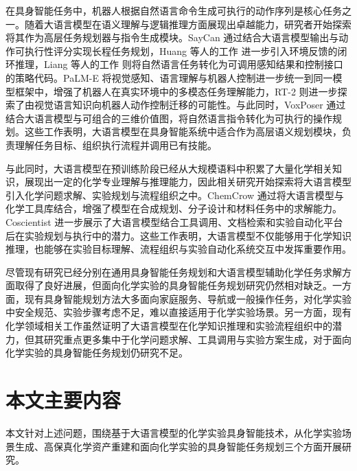 在具身智能任务中，机器人根据自然语言命令生成可执行的动作序列是核心任务之一。随着大语言模型在语义理解与逻辑推理方面展现出卓越能力，研究者开始探索将其作为高层任务规划器与指令生成模块。SayCan\cite{ichter2023saycan} 通过结合大语言模型输出与动作可执行性评分实现长程任务规划，Huang 等人的工作\cite{huang2023innermonologue} 进一步引入环境反馈的闭环推理，Liang 等人的工作\cite{liang2023codeaspolicies} 则将自然语言任务转化为可调用感知结果和控制接口的策略代码。PaLM-E\cite{driess2023palme} 将视觉感知、语言理解与机器人控制进一步统一到同一模型框架中，增强了机器人在真实环境中的多模态任务理解能力，RT-2\cite{zitkovich2023rt2} 则进一步探索了由视觉语言知识向机器人动作控制迁移的可能性。与此同时，VoxPoser\cite{huang2023voxposer} 通过结合大语言模型与可组合的三维价值图，将自然语言指令转化为可执行的操作规划。这些工作表明，大语言模型在具身智能系统中适合作为高层语义规划模块，负责理解任务目标、组织执行流程并调用已有技能。

与此同时，大语言模型在预训练阶段已经从大规模语料中积累了大量化学相关知识，展现出一定的化学专业理解与推理能力，因此相关研究开始探索将大语言模型引入化学问题求解、实验规划与流程组织之中。ChemCrow\cite{bran2024chemcrow} 通过将大语言模型与化学工具库结合，增强了模型在合成规划、分子设计和材料任务中的求解能力。Coscientist\cite{boiko2023coscientist} 进一步展示了大语言模型结合工具调用、文档检索和实验自动化平台后在实验规划与执行中的潜力。这些工作表明，大语言模型不仅能够用于化学知识推理，也能够在实验目标理解、流程组织与实验自动化系统交互中发挥重要作用。


尽管现有研究已经分别在通用具身智能任务规划和大语言模型辅助化学任务求解方面取得了良好进展，但面向化学实验的具身智能任务规划研究仍然相对缺乏。一方面，现有具身智能规划方法大多面向家庭服务、导航或一般操作任务，对化学实验中安全规范、实验步骤考虑不足，难以直接适用于化学实验场景。另一方面，现有化学领域相关工作虽然证明了大语言模型在化学知识推理和实验流程组织中的潜力，但其研究重点更多集中于化学问题求解、工具调用与实验方案生成，对于面向化学实验的具身智能任务规划仍研究不足。



\section{本文主要内容}
\label{sec:intro_main_contributions}

本文针对上述问题，围绕基于大语言模型的化学实验具身智能技术，从化学实验场景生成、高保真化学资产重建和面向化学实验的具身智能任务规划三个方面开展研究。

